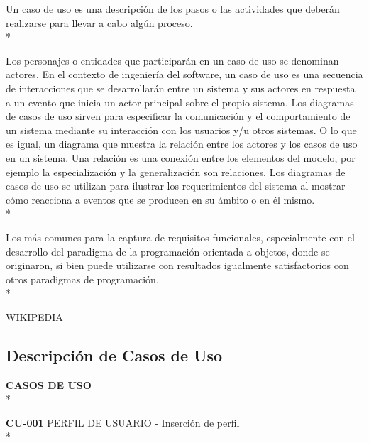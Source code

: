 \documentclass[../pfc.tex]{subfiles}
\begin{document}
	Un caso de uso es una descripción de los pasos o las actividades que deberán realizarse para llevar a cabo algún proceso.\\*
	
	Los personajes o entidades que participarán en un caso de uso se denominan actores. En el contexto de ingeniería del software, un caso de uso es una secuencia de interacciones que se desarrollarán entre un sistema y sus actores en respuesta a un evento que inicia un actor principal sobre el propio sistema. Los diagramas de casos de uso sirven para especificar la comunicación y el comportamiento de un sistema mediante su interacción con los usuarios y/u otros sistemas. O lo que es igual, un diagrama que muestra la relación entre los actores y los casos de uso en un sistema. Una relación es una conexión entre los elementos del modelo, por ejemplo la especialización y la generalización son relaciones. Los diagramas de casos de uso se utilizan para ilustrar los requerimientos del sistema al mostrar cómo reacciona a eventos que se producen en su ámbito o en él mismo.\\*
	
	Los más comunes para la captura de requisitos funcionales, especialmente con el desarrollo del paradigma de la programación orientada a objetos, donde se originaron, si bien puede utilizarse con resultados igualmente satisfactorios con otros paradigmas de programación.\\*
	
	WIKIPEDIA


	\subsection{Descripción de Casos de Uso}
	
	\textbf{CASOS DE USO}\\*
	
	\textbf{CU-001} PERFIL DE USUARIO - Inserción de perfil\\*
	
\end{document}
